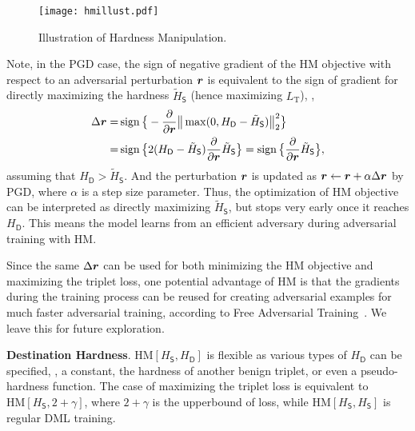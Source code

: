 \documentclass[10pt,twocolumn,letterpaper]{article}
\begin{document}
\begin{figure}
	\texttt{[image: hmillust.pdf]}
	\caption{Illustration of Hardness Manipulation.}
	\label{fig:hm}
\end{figure}


Note, in the PGD case, the sign of negative gradient of the HM objective with
respect to an adversarial perturbation ${\bm{r}}$ is equivalent to the sign of
gradient for directly maximizing the hardness $\tilde{H}_\mathsf{S}$ (hence
maximizing $L_\text{T}$), \ie,
%
\begin{align}
	\Delta {\bm{r}}
	=&
	\operatorname{sign}\big\{
		-\frac{\partial}{\partial {\bm{r}}} \big\| \max(0, 
		H_\mathsf{D} - \tilde{H}_\mathsf{S} ) \big\|_2^2
	\big\}
	\\
	=&
	\operatorname{sign}\big\{
		2(H_\mathsf{D} - \tilde{H}_\mathsf{S})
		\frac{\partial }{\partial {\bm{r}}} \tilde{H}_\mathsf{S} \big\}
	=
	\operatorname{sign}\big\{
		\frac{\partial}{\partial {\bm{r}}} \tilde{H}_\mathsf{S}
		\big\},
\end{align}
%
assuming that $H_\mathsf{D}>\tilde{H}_\mathsf{S}$.
%
And the perturbation ${\bm{r}}$ is updated as ${\bm{r}} \leftarrow {\bm{r}} + \alpha \Delta {\bm{r}}$
by PGD, where $\alpha$ is a step size parameter.
%
Thus, the optimization of HM objective can be interpreted as directly
maximizing $\tilde{H}_\mathsf{S}$, but stops very early once it reaches
$H_\mathsf{D}$.
%
This means the model learns from an efficient adversary during adversarial
training with HM.

Since the same $\Delta{\bm{r}}$ can be used for both minimizing the HM objective
and maximizing the triplet loss, one potential advantage of HM is that
the gradients during the training process can be reused for creating
adversarial examples for much faster adversarial training, according to 
Free Adversarial Training~\cite{freeat}.
%
We leave this for future exploration.


\textbf{Destination Hardness}.
%
$\text{HM}[H_\mathsf{S},H_\mathsf{D}]$ is flexible as various
types of $H_\mathsf{D}$ can be specified, \eg, a constant, the
hardness of another benign triplet, or even a pseudo-hardness function.
%
The case of maximizing the triplet loss is equivalent to
$\text{HM}[H_\mathsf{S},2+\gamma]$, where $2+\gamma$ is the 
upperbound of loss, while $\text{HM}[H_\mathsf{S},H_\mathsf{S}]$
is regular DML training.
\end{document}
